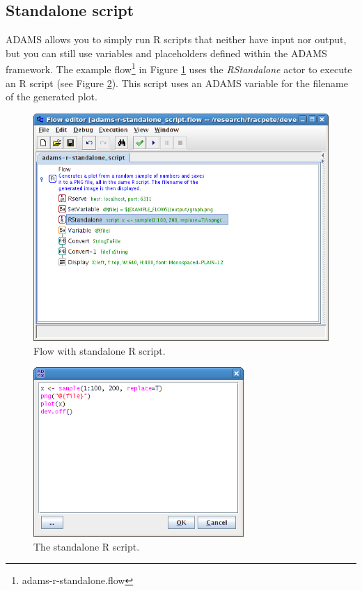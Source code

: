 \documentclass[a4paper]{book}
\begin{document}
\subsection{Standalone script}
ADAMS allows you to simply run R scripts that neither have input nor output,
but you can still use variables and placeholders defined within the ADAMS
framework. The example flow\footnote{adams-r-standalone.flow} in 
Figure \ref{standalone-flow} uses the \textit{RStandalone} actor to execute
an R script (see Figure \ref{standalone-script}). This script uses an ADAMS
variable for the filename of the generated plot.
\begin{figure}[ht]
	\centering
	\includegraphics[width=\textwidth]{images/standalone-flow.png}
	\caption{Flow with standalone R script.}
	\label{standalone-flow}
\end{figure}
\begin{figure}[ht]
	\centering
	\includegraphics[width=8cm]{images/standalone-script.png}
	\caption{The standalone R script.}
	\label{standalone-script}
\end{figure}
\end{document}
